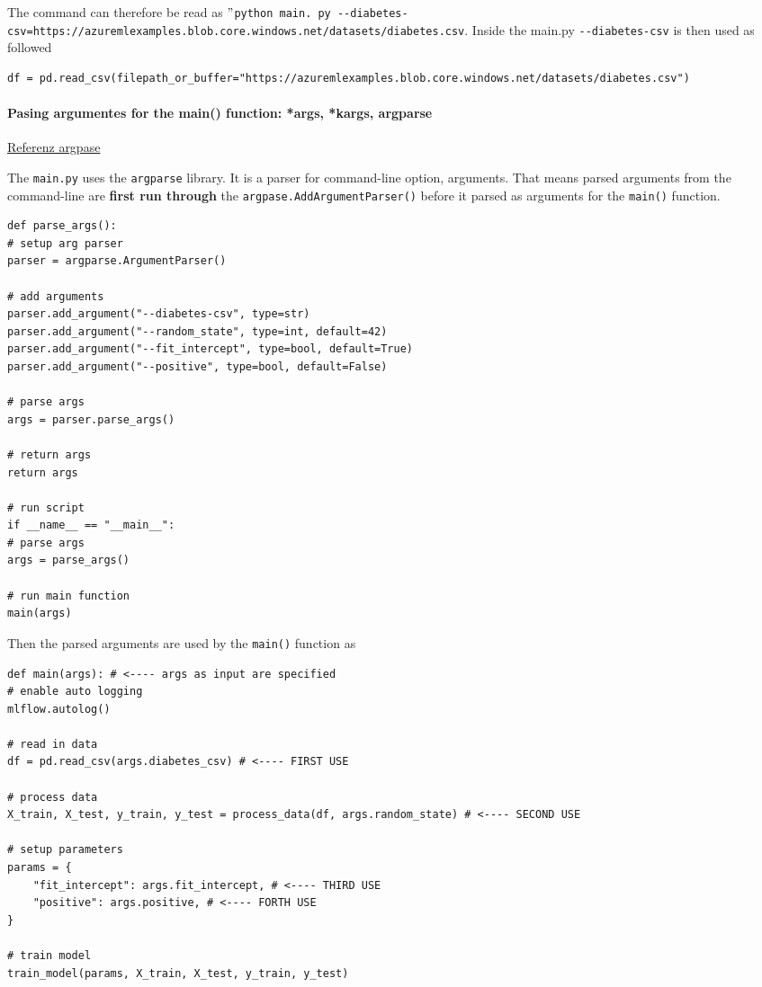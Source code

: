 The command can therefore be read as $"$\verb+python main. py --diabetes-csv=https://azuremlexamples.blob.core.windows.net/datasets/diabetes.csv+. Inside the main.py \verb+--diabetes-csv+ is then used as followed
\begin{lstlisting}[language=iPython]
	df = pd.read_csv(filepath_or_buffer="https://azuremlexamples.blob.core.windows.net/datasets/diabetes.csv")
\end{lstlisting}

\paragraph{Pasing argumentes for the main() function: *args, *kargs, argparse}
\href{https://docs.python.org/3/library/argparse.html}{Referenz argpase}

The \verb+main.py+ uses the \verb+argparse+ library. It is a parser for command-line option, arguments. That means parsed arguments from the command-line are \textbf{first run through} the \verb+argpase.AddArgumentParser()+ before it parsed as arguments for the \verb+main()+ function. 
\begin{lstlisting}[language=iPython]
def parse_args():
# setup arg parser
parser = argparse.ArgumentParser()

# add arguments
parser.add_argument("--diabetes-csv", type=str)
parser.add_argument("--random_state", type=int, default=42)
parser.add_argument("--fit_intercept", type=bool, default=True)
parser.add_argument("--positive", type=bool, default=False)

# parse args
args = parser.parse_args()

# return args
return args

# run script
if __name__ == "__main__":
# parse args
args = parse_args()

# run main function
main(args)
\end{lstlisting}

Then the parsed arguments are used by the \verb+main()+ function as
\begin{lstlisting}[language=iPython]
def main(args): # <---- args as input are specified
# enable auto logging
mlflow.autolog()

# read in data
df = pd.read_csv(args.diabetes_csv) # <---- FIRST USE

# process data
X_train, X_test, y_train, y_test = process_data(df, args.random_state) # <---- SECOND USE

# setup parameters
params = {
	"fit_intercept": args.fit_intercept, # <---- THIRD USE
	"positive": args.positive, # <---- FORTH USE
}    

# train model
train_model(params, X_train, X_test, y_train, y_test)
\end{lstlisting}


